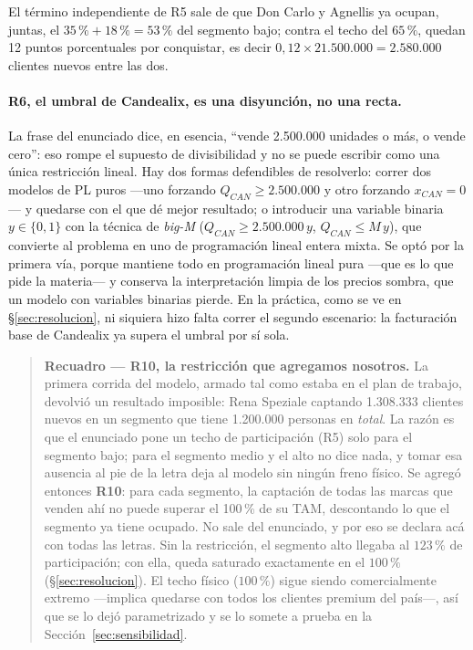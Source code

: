 \documentclass[10pt,a4paper]{article}
\begin{document}
El término independiente de R5 sale de que Don Carlo y Agnellis ya ocupan,
juntas, el $35\,\%+18\,\%=53\,\%$ del segmento bajo; contra el techo del
$65\,\%$, quedan 12 puntos porcentuales por conquistar, es decir
$0{,}12\times 21{.}500{.}000=2{.}580{.}000$ clientes nuevos entre las dos.

\paragraph{R6, el umbral de Candealix, es una disyunción, no una recta.} La
frase del enunciado dice, en esencia, ``vende 2.500.000 unidades o más, o
vende cero'': eso rompe el supuesto de divisibilidad y no se puede escribir
como una única restricción lineal. Hay dos formas defendibles de resolverlo:
correr dos modelos de PL puros —uno forzando $Q_{CAN}\geq 2{.}500{.}000$ y otro
forzando $x_{CAN}=0$— y quedarse con el que dé mejor resultado; o introducir
una variable binaria $y\in\{0,1\}$ con la técnica de \emph{big-M}
($Q_{CAN}\geq 2.500.000\,y$, $Q_{CAN}\leq M\,y$), que convierte al problema en
uno de programación lineal entera mixta. Se optó por la primera vía, porque
mantiene todo en programación lineal pura —que es lo que pide la
materia— y conserva la interpretación limpia de los precios sombra, que un
modelo con variables binarias pierde. En la práctica, como se ve en
\S\ref{sec:resolucion}, ni siquiera hizo falta correr el segundo escenario:
la facturación base de Candealix ya supera el umbral por sí sola.

\begin{quote}
\small
\textbf{Recuadro — R10, la restricción que agregamos nosotros.}\label{box:r10}
La primera corrida del modelo, armado tal como estaba en el plan de trabajo,
devolvió un resultado imposible: Rena Speziale captando 1.308.333 clientes
nuevos en un segmento que tiene 1.200.000 personas en \emph{total}. La razón es
que el enunciado pone un techo de participación (R5) solo para el segmento
bajo; para el segmento medio y el alto no dice nada, y tomar esa ausencia al
pie de la letra deja al modelo sin ningún freno físico. Se agregó entonces
\textbf{R10}: para cada segmento, la captación de todas las marcas que venden
ahí no puede superar el 100\,\% de su TAM, descontando lo que el segmento ya
tiene ocupado. No sale del enunciado, y por eso se declara acá con todas las
letras. Sin la restricción, el segmento alto llegaba al $123\,\%$ de
participación; con ella, queda saturado exactamente en el $100\,\%$
(\S\ref{sec:resolucion}). El techo físico ($100\,\%$) sigue siendo
comercialmente extremo —implica quedarse con todos los clientes premium del
país—, así que se lo dejó parametrizado y se lo somete a prueba en la
Sección~\ref{sec:sensibilidad}.
\end{quote}
\end{document}
